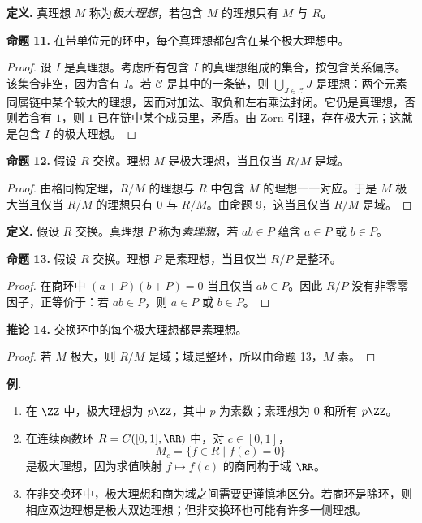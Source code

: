 \medskip
\noindent\textbf{定义.} 真理想 $M$ 称为\emph{极大理想}，若包含 $M$ 的理想只有 $M$ 与 $R$。

\medskip
\noindent\textbf{命题 11.} 在带单位元的环中，每个真理想都包含在某个极大理想中。

\begin{proof}
设 $I$ 是真理想。考虑所有包含 $I$ 的真理想组成的集合，按包含关系偏序。该集合非空，因为含有 $I$。若 $\mathcal C$ 是其中的一条链，则 $\bigcup_{J\in\mathcal C}J$ 是理想：两个元素同属链中某个较大的理想，因而对加法、取负和左右乘法封闭。它仍是真理想，否则若含有 $1$，则 $1$ 已在链中某个成员里，矛盾。由 Zorn 引理，存在极大元；这就是包含 $I$ 的极大理想。
\end{proof}

\medskip
\noindent\textbf{命题 12.} 假设 $R$ 交换。理想 $M$ 是极大理想，当且仅当 $R/M$ 是域。

\begin{proof}
由格同构定理，$R/M$ 的理想与 $R$ 中包含 $M$ 的理想一一对应。于是 $M$ 极大当且仅当 $R/M$ 的理想只有 $0$ 与 $R/M$。由命题 9，这当且仅当 $R/M$ 是域。
\end{proof}

\medskip
\noindent\textbf{定义.} 假设 $R$ 交换。真理想 $P$ 称为\emph{素理想}，若 $ab\in P$ 蕴含 $a\in P$ 或 $b\in P$。

\medskip
\noindent\textbf{命题 13.} 假设 $R$ 交换。理想 $P$ 是素理想，当且仅当 $R/P$ 是整环。

\begin{proof}
在商环中 $(a+P)(b+P)=0$ 当且仅当 $ab\in P$。因此 $R/P$ 没有非零零因子，正等价于：若 $ab\in P$，则 $a\in P$ 或 $b\in P$。
\end{proof}

\medskip
\noindent\textbf{推论 14.} 交换环中的每个极大理想都是素理想。

\begin{proof}
若 $M$ 极大，则 $R/M$ 是域；域是整环，所以由命题 13，$M$ 素。
\end{proof}

\medskip
\noindent\textbf{例.}
\begin{enumerate}[label=(\arabic*)]
  \item 在 $\ZZ$ 中，极大理想为 $p\ZZ$，其中 $p$ 为素数；素理想为 $0$ 和所有 $p\ZZ$。
  \item 在连续函数环 $R=C([0,1],\RR)$ 中，对 $c\in[0,1]$，
  \[
    M_c=\{f\in R\mid f(c)=0\}
  \]
  是极大理想，因为求值映射 $f\mapsto f(c)$ 的商同构于域 $\RR$。
  \item 在非交换环中，极大理想和商为域之间需要更谨慎地区分。若商环是除环，则相应双边理想是极大双边理想；但非交换环也可能有许多一侧理想。
\end{enumerate}


